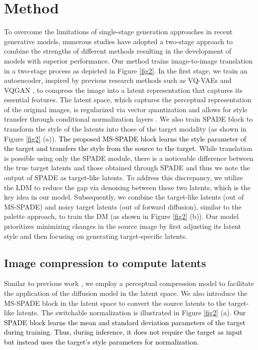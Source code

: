 \documentclass[10pt,twocolumn,letterpaper]{article}
\newcommand{\jhk}[2]{\textcolor{black}{{}#2}}
\begin{document}
\section{Method}
To overcome the limitations of single-stage generation approaches in recent generative models, numerous studies \cite{razavi2019generating, daidiagnosing, esser2021taming, ramesh2021zero, yan2021videogpt} have adopted a two-stage approach to combine the strengths of different methods resulting in the development of models with superior performance. Our method trains image-to-image translation in a two-stage process as depicted in Figure \ref{fig2}. In the first stage, we train an autoencoder, inspired by previous research methods such as VQ-VAEs and VQGAN \cite{van2017neural, razavi2019generating, esser2021taming}, to compress the image into a latent representation that captures its essential features. The latent space, which captures the perceptual representation of the original images, is regularized via vector quantization and allows for style transfer through conditional normalization layers \cite{park2019semantic}. We also train SPADE block to transform the style of the latents into those of the target modality (as shown in Figure \ref{fig2} (a)). \jhk{}{The proposed MS-SPADE block learns the style parameter of the target and transfers the style from the source to the target.} While translation is possible using only the SPADE module, there is a noticeable difference between the true target latents and those obtained through SPADE and thus we note the output of SPADE as target-like latents. To address this discrepancy, we utilize the LDM to reduce the gap via denoising between these two latents, which is the key idea in our model. Subsequently, we combine the target-like latents (out of MS-SPADE) and noisy target latents (out of forward diffusion), similar to the palette approach, to train the DM (as shown in Figure \ref{fig2} (b)). Our model prioritizes minimizing changes in the source image by first adjusting its latent style and then focusing on generating target-specific latents. 

\subsection{Image compression to compute latents}
Similar to previous work \cite{esser2021taming, rombach2022high, pinaya2022brain}, we employ a perceptual compression model to facilitate the application of the diffusion model in the latent space. We also introduce the MS-SPADE block in the latent space to convert the source latents to the target-like latents. The switchable normalization is illustrated in Figure \ref{fig2} (a). \jhk{}{Our SPADE block learns the mean and standard deviation parameters of the target during training. Thus, during inference, it does not require the target as input but instead uses the target's style parameters for normalization.}
\end{document}
